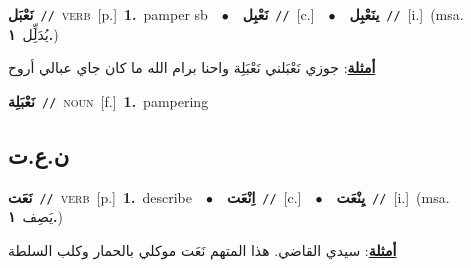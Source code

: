 \documentclass[10pt,a4paper,twoside]{article} %
\begin{document}
\begin{multicols}{2}
{\setlength\topsep{0pt}\textbf{\foreignlanguage{arabic}{نَعْبَل}}\ {\color{gray}\texttt{//}\color{black}}\ \textsc{verb}\ [p.]\ \textbf{1.}~pamper sb\ \ $\bullet$\ \ \setlength\topsep{0pt}\textbf{\foreignlanguage{arabic}{نَعْبِل}}\ {\color{gray}\texttt{//}\color{black}}\ [c.]\ \ $\bullet$\ \ \setlength\topsep{0pt}\textbf{\foreignlanguage{arabic}{ينَعْبِل}}\ {\color{gray}\texttt{//}\color{black}}\ [i.]\ \color{gray}(msa. \foreignlanguage{arabic}{يُدَلِِّل}~\foreignlanguage{arabic}{\textbf{١.}})\color{black}\  \begin{flushright}\color{gray}\foreignlanguage{arabic}{\textbf{\underline{\foreignlanguage{arabic}{أمثلة}}}: جوزي نَعْبَلني نَعْبَلِة واحنا برام الله ما كان جاي عبالي أروح}\end{flushright}\color{black}} \vspace{2mm}

{\setlength\topsep{0pt}\textbf{\foreignlanguage{arabic}{نَعْبَلِة}}\ {\color{gray}\texttt{//}\color{black}}\ \textsc{noun}\ [f.]\ \textbf{1.}~pampering\ } \vspace{2mm}

\vspace{-3mm}
\subsection*{\color{blue}\foreignlanguage{arabic}{ن.ع.ت}\color{blue}{}} 

{\setlength\topsep{0pt}\textbf{\foreignlanguage{arabic}{نَعَت}}\ {\color{gray}\texttt{//}\color{black}}\ \textsc{verb}\ [p.]\ \textbf{1.}~describe\ \ $\bullet$\ \ \setlength\topsep{0pt}\textbf{\foreignlanguage{arabic}{اِنْعَت}}\ {\color{gray}\texttt{//}\color{black}}\ [c.]\ \ $\bullet$\ \ \setlength\topsep{0pt}\textbf{\foreignlanguage{arabic}{يِنْعَت}}\ {\color{gray}\texttt{//}\color{black}}\ [i.]\ \color{gray}(msa. \foreignlanguage{arabic}{يَصِف}~\foreignlanguage{arabic}{\textbf{١.}})\color{black}\  \begin{flushright}\color{gray}\foreignlanguage{arabic}{\textbf{\underline{\foreignlanguage{arabic}{أمثلة}}}: سيدي القاضي. هذا المتهم نَعَت موكلي بالحمار وكلب السلطة}\end{flushright}\color{black}} \vspace{2mm}


\end{multicols}
\end{document}
